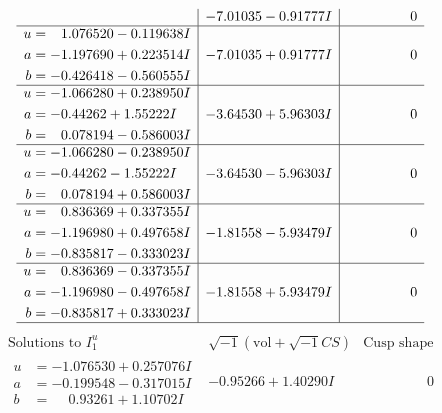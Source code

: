 \documentclass[1p]{elsarticle_modified}
\theoremstyle{definition}
\newcommand{\I}{\sqrt{-1}}
\begin{document}
$$\begin{array}{c|c|c}
 & -7.01035 - 0.91777 I & \phantom{-0.000000 } 0 \\ \hline\begin{aligned}
u &= \phantom{-}1.076520 - 0.119638 I \\
a &= -1.197690 + 0.223514 I \\
b &= -0.426418 - 0.560555 I\end{aligned}
 & -7.01035 + 0.91777 I & \phantom{-0.000000 } 0 \\ \hline\begin{aligned}
u &= -1.066280 + 0.238950 I \\
a &= -0.44262 + 1.55222 I \\
b &= \phantom{-}0.078194 - 0.586003 I\end{aligned}
 & -3.64530 + 5.96303 I & \phantom{-0.000000 } 0 \\ \hline\begin{aligned}
u &= -1.066280 - 0.238950 I \\
a &= -0.44262 - 1.55222 I \\
b &= \phantom{-}0.078194 + 0.586003 I\end{aligned}
 & -3.64530 - 5.96303 I & \phantom{-0.000000 } 0 \\ \hline\begin{aligned}
u &= \phantom{-}0.836369 + 0.337355 I \\
a &= -1.196980 + 0.497658 I \\
b &= -0.835817 - 0.333023 I\end{aligned}
 & -1.81558 - 5.93479 I & \phantom{-0.000000 } 0 \\ \hline\begin{aligned}
u &= \phantom{-}0.836369 - 0.337355 I \\
a &= -1.196980 - 0.497658 I \\
b &= -0.835817 + 0.333023 I\end{aligned}
 & -1.81558 + 5.93479 I & \phantom{-0.000000 } 0\\
 \hline 
 \end{array}$$\newpage$$\begin{array}{c|c|c}  
\text{Solutions to }I^u_{1}& \I (\text{vol} + \sqrt{-1}CS) & \text{Cusp shape}\\
 \hline 
\begin{aligned}
u &= -1.076530 + 0.257076 I \\
a &= -0.199548 - 0.317015 I \\
b &= \phantom{-}0.93261 + 1.10702 I\end{aligned}
 & -0.95266 + 1.40290 I & \phantom{-0.000000 } 0 \\ \hline\begin{aligned}

\end{aligned}
\end{array}$$
\end{document}
